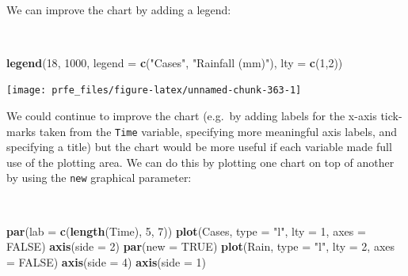 \documentclass[12pt,a4paper]{book}
\newenvironment{Shaded}{\begin{snugshade}}{\end{snugshade}}
\newcommand{\KeywordTok}[1]{\textcolor[rgb]{0.13,0.29,0.53}{\textbf{#1}}}
\newcommand{\DataTypeTok}[1]{\textcolor[rgb]{0.13,0.29,0.53}{#1}}
\newcommand{\DecValTok}[1]{\textcolor[rgb]{0.00,0.00,0.81}{#1}}
\newcommand{\StringTok}[1]{\textcolor[rgb]{0.31,0.60,0.02}{#1}}
\newcommand{\OtherTok}[1]{\textcolor[rgb]{0.56,0.35,0.01}{#1}}
\newcommand{\NormalTok}[1]{#1}
\theoremstyle{definition}
\theoremstyle{definition}
\theoremstyle{definition}
\theoremstyle{remark}
\begin{document}
~

We can improve the chart by adding a legend:

~

\begin{Shaded}
\begin{Highlighting}[]
\KeywordTok{legend}\NormalTok{(}\DecValTok{18}\NormalTok{, }\DecValTok{1000}\NormalTok{, }\DataTypeTok{legend =} \KeywordTok{c}\NormalTok{(}\StringTok{"Cases"}\NormalTok{, }\StringTok{"Rainfall (mm)"}\NormalTok{), }\DataTypeTok{lty =} \KeywordTok{c}\NormalTok{(}\DecValTok{1}\NormalTok{,}\DecValTok{2}\NormalTok{))}
\end{Highlighting}
\end{Shaded}

\begin{center}\texttt{[image: prfe\_files/figure-latex/unnamed-chunk-363-1]} \end{center}

\newpage

We could continue to improve the chart (e.g.~by adding labels for the
x-axis tick-marks taken from the \texttt{Time} variable, specifying more
meaningful axis labels, and specifying a title) but the chart would be
more useful if each variable made full use of the plotting area. We can
do this by plotting one chart on top of another by using the
\texttt{new} graphical parameter:

~

\begin{Shaded}
\begin{Highlighting}[]
\KeywordTok{par}\NormalTok{(}\DataTypeTok{lab =} \KeywordTok{c}\NormalTok{(}\KeywordTok{length}\NormalTok{(Time), }\DecValTok{5}\NormalTok{, }\DecValTok{7}\NormalTok{))}
\KeywordTok{plot}\NormalTok{(Cases, }\DataTypeTok{type =} \StringTok{"l"}\NormalTok{, }\DataTypeTok{lty =} \DecValTok{1}\NormalTok{, }\DataTypeTok{axes =} \OtherTok{FALSE}\NormalTok{)}
\KeywordTok{axis}\NormalTok{(}\DataTypeTok{side =} \DecValTok{2}\NormalTok{)}
\KeywordTok{par}\NormalTok{(}\DataTypeTok{new =} \OtherTok{TRUE}\NormalTok{)}
\KeywordTok{plot}\NormalTok{(Rain, }\DataTypeTok{type =} \StringTok{"l"}\NormalTok{, }\DataTypeTok{lty =} \DecValTok{2}\NormalTok{, }\DataTypeTok{axes =} \OtherTok{FALSE}\NormalTok{)}
\KeywordTok{axis}\NormalTok{(}\DataTypeTok{side =} \DecValTok{4}\NormalTok{)}
\KeywordTok{axis}\NormalTok{(}\DataTypeTok{side =} \DecValTok{1}\NormalTok{)}
\end{Highlighting}
\end{Shaded}
\end{document}
